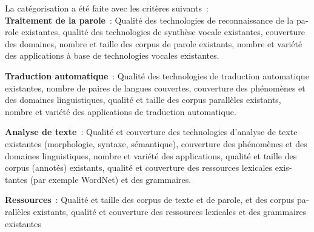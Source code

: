 \begin{french}
\begin{multicols}{2}
La catégorisation a été faite avec les critères suivants~:\\

{\bf Traitement de la parole}~: Qualité des technologies de
reconnaissance de la parole existantes, qualité des technologies de
synthèse vocale existantes, couverture des domaines, nombre et taille
des corpus de parole existants, nombre et variété des applications à
base de technologies vocales existantes.

{\bf Traduction automatique}~: Qualité des technologies de traduction
automatique existantes, nombre de paires de langues couvertes,
couverture des phénomènes et des domaines linguistiques, qualité et
taille des corpus parallèles existants, nombre et variété des
applications de traduction automatique.

{\bf Analyse de texte}~: Qualité et couverture des technologies
d'analyse de texte existantes (morphologie, syntaxe, sémantique),
couverture des phénomènes et des domaines linguistiques, nombre et
variété des applications, qualité et taille des corpus (annotés)
existants, qualité et couverture des ressources lexicales existantes
(par exemple WordNet) et des grammaires.

{\bf Ressources}~: Qualité et taille des corpus de texte et de parole,
et des corpus parallèles existants, qualité et couverture des
ressources lexicales et des grammaires existantes


\end{multicols}
\end{french}
